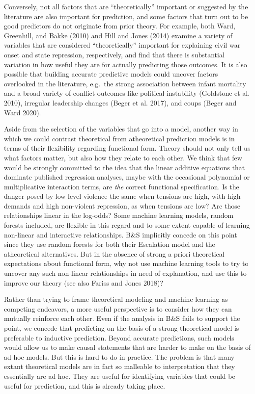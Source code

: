 \documentclass[
]{article}
\begin{document}
Conversely, not all factors that are ``theoretically'' important or suggested by the literature are also important for prediction, and some factors that turn out to be good predictors do not originate from prior theory. For example, both Ward, Greenhill, and Bakke (2010) and Hill and Jones (2014) examine a variety of variables that are considered ``theoretically'' important for explaining civil war onset and state repression, respectively, and find that there is substantial variation in how useful they are for actually predicting those outcomes. It is also possible that building accurate predictive models could uncover factors overlooked in the literature, e.g.~the strong association between infant mortality and a broad variety of conflict outcomes like political instability (Goldstone et al. 2010), irregular leadership changes (Beger et al. 2017), and coups (Beger and Ward 2020).

Aside from the selection of the variables that go into a model, another way in which we could contrast theoretical from atheoretical prediction models is in terms of their flexibility regarding functional form. Theory should not only tell us what factors matter, but also how they relate to each other. We think that few would be strongly committed to the idea that the linear additive equations that dominate published regression analyses, maybe with the occasional polynomial or multiplicative interaction terms, are \emph{the} correct functional specification. Is the danger posed by low-level violence the same when tensions are high, with high demands and high non-violent repression, as when tensions are low? Are those relationships linear in the log-odds? Some machine learning models, random forests included, are flexible in this regard and to some extent capable of learning non-linear and interactive relationships. B\&S implicitly concede on this point since they use random forests for both their Escalation model and the atheoretical alternatives. But in the absence of strong a priori theoretical expectations about functional form, why not use machine learning tools to try to uncover any such non-linear relationships in need of explanation, and use this to improve our theory (see also Fariss and Jones 2018)?

Rather than trying to frame theoretical modeling and machine learning as competing endeavors, a more useful perspective is to consider how they can mutually reinforce each other. Even if the analysis in B\&S fails to support the point, we concede that predicting on the basis of a strong theoretical model is preferable to inductive prediction. Beyond accurate predictions, such models would allow us to make causal statements that are harder to make on the basis of ad hoc models. But this is hard to do in practice. The problem is that many extant theoretical models are in fact so malleable to interpretation that they essentially are ad hoc. They are useful for identifying variables that could be useful for prediction, and this is already taking place.
\end{document}
